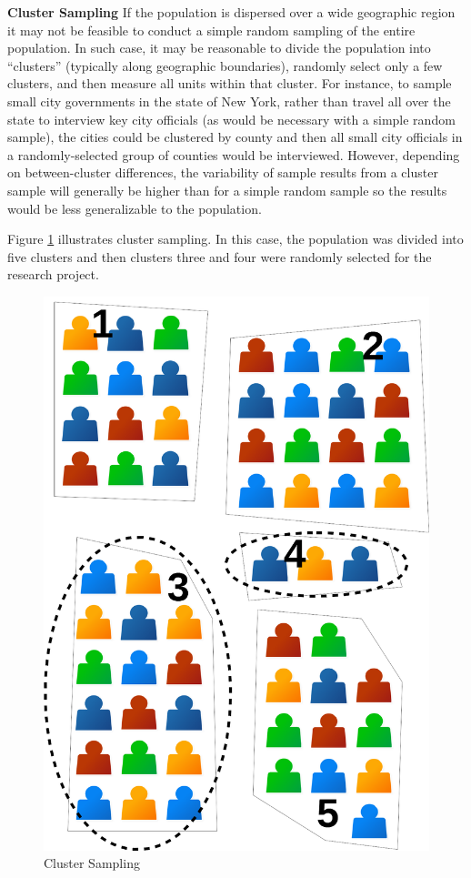 \textbf{Cluster Sampling} If the population is dispersed over a wide geographic region it may not be feasible to conduct a simple random sampling of the entire population. In such case, it may be reasonable to divide the population into ``clusters'' (typically along geographic boundaries), randomly select only a few clusters, and then measure all units within that cluster. For instance, to sample small city governments in the state of New York, rather than travel all over the state to interview key city officials (as would be necessary with a simple random sample), the cities could be clustered by county and then all small city officials in a randomly-selected group of counties would be interviewed. However, depending on between-cluster differences, the variability of sample results from a cluster sample will generally be higher than for a simple random sample so the results would be less generalizable to the population.

Figure \ref{07:fig05} illustrates cluster sampling. In this case, the population was divided into five clusters and then clusters three and four were randomly selected for the research project.

\begin{figure}[H]
	\centering
	\includegraphics[width=\maxwidth{.35\linewidth}]{gfx/07-05}
	\caption{Cluster Sampling}
	\label{07:fig05}
\end{figure}

